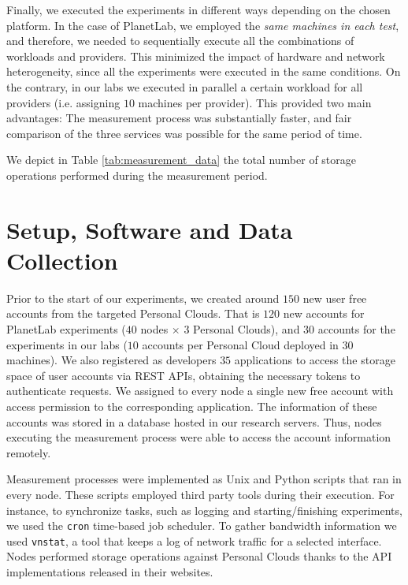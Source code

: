 Finally, we executed the experiments
in different ways depending on the chosen platform. In the case of
PlanetLab, we employed the \textit{same machines in each test}, and therefore, 
we needed to sequentially execute all the combinations of workloads and providers. 
This minimized the impact of hardware and network
heterogeneity, since all the experiments were executed in the same conditions.
On the contrary, in our labs we executed in parallel a certain workload
for all providers (i.e. assigning $10$ machines per provider).
This provided two main advantages: The measurement process was
substantially faster, and fair comparison of the three services
was possible for the same period of time. 
 
We depict in Table \ref{tab:measurement_data} the total 
number of storage operations performed during the measurement period.

\section{Setup, Software and Data Collection}

Prior to the start of our experiments, we created 
around $150$ new user free accounts from the targeted Personal Clouds.
That is $120$ new accounts for PlanetLab experiments ($40$ nodes
$\times$ $3$ Personal Clouds), and $30$ accounts for the experiments
in our labs ($10$ accounts per Personal Cloud deployed in $30$ machines). 
We also registered as developers $35$ applications to access the storage
space of user accounts via REST APIs, obtaining the necessary tokens
to authenticate requests.
We assigned to every node a single new free account with access permission
to the corresponding application.
The information of these accounts was stored in a database hosted in our research servers.
Thus, nodes executing the measurement process were able to access the
account information remotely. 

Measurement processes were implemented as
Unix and Python scripts that ran in every node. These scripts employed
third party tools during their execution. For instance, to synchronize tasks, 
such as logging and starting/finishing
experiments, we used the \texttt{cron} time-based job scheduler.
To gather bandwidth information we used
\texttt{vnstat}, %
a tool that keeps a log of network 
traffic for a selected interface. Nodes performed storage operations against Personal Clouds 
thanks to the API implementations released in their websites. 

